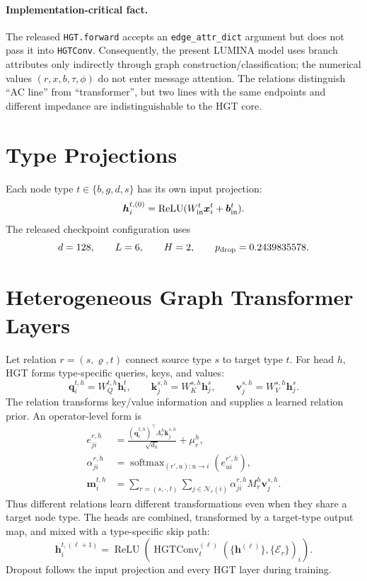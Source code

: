\documentclass[10pt]{article}
\newcommand{\code}[1]{\texttt{#1}}
\begin{document}
\paragraph{Implementation-critical fact.}
The released \code{HGT.forward} accepts an \code{edge\_attr\_dict} argument but
does not pass it into \code{HGTConv}. Consequently, the present LUMINA model uses
branch attributes only indirectly through graph construction/classification;
the numerical values \((r,x,b,\tau,\phi)\) do not enter message attention. The
relations distinguish ``AC line'' from ``transformer'', but two lines with the
same endpoints and different impedance are indistinguishable to the HGT core.

\section{Type Projections}

Each node type \(t\in\{b,g,d,s\}\) has its own input projection:
\begin{equation}
 \bm h_i^{t,(0)}=\operatorname{ReLU}(W_{\rm in}^{t}\bm x_i^t+\bm b_{\rm in}^{t}).
\end{equation}
The released checkpoint configuration uses
\begin{equation}
 d=128,\qquad L=6,\qquad H=2,\qquad p_{\rm drop}=0.2439835578.
\end{equation}

\section{Heterogeneous Graph Transformer Layers}

Let relation \(r=(s,\varrho,t)\) connect source type \(s\) to target type \(t\).
For head \(h\), HGT forms type-specific queries, keys, and values:
\begin{equation}
 \bm q_i^{t,h}=W_Q^{t,h}\bm h_i^t,\qquad
 \bm k_j^{s,h}=W_K^{s,h}\bm h_j^s,\qquad
 \bm v_j^{s,h}=W_V^{s,h}\bm h_j^s.
\end{equation}
The relation transforms key/value information and supplies a learned relation
prior. An operator-level form is
\begin{align}
 e_{ji}^{r,h}&=\frac{(\bm q_i^{t,h})^\top A_r^h\bm k_j^{s,h}}
 {\sqrt{d_h}}+\mu_r^h,\\
 \alpha_{ji}^{r,h}&=\operatorname{softmax}_{(r',u):u\to i}(e_{ui}^{r',h}),\\
 \bm m_i^{t,h}&=\sum_{r=(s,\cdot,t)}\sum_{j\in\mathcal N_r(i)}
 \alpha_{ji}^{r,h}M_r^h\bm v_j^{s,h}.
\end{align}
Thus different relations learn different transformations even when they share a
target node type. The heads are combined, transformed by a target-type output
map, and mixed with a type-specific skip path:
\begin{equation}
 \bm h_i^{t,(\ell+1)}=\operatorname{ReLU}
 \left(\operatorname{HGTConv}^{(\ell)}_t
 (\{\bm h^{(\ell)}\},\{\mathcal E_r\})_i\right).
\end{equation}
Dropout follows the input projection and every HGT layer during training.
\end{document}
